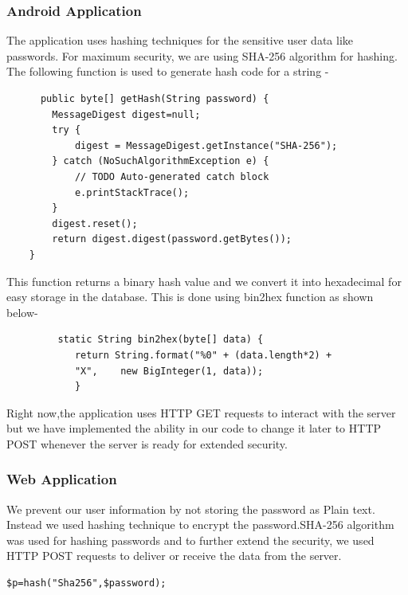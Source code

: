 \documentclass{article}
\begin{document}
\subsubsection{Android Application}
The application uses hashing techniques for the sensitive user data like passwords. 
For maximum security, we are using SHA-256 algorithm for hashing. 
The following function is used to generate hash code for a string -
\begin{lstlisting}
      public byte[] getHash(String password) {
        MessageDigest digest=null;
        try {
            digest = MessageDigest.getInstance("SHA-256");
        } catch (NoSuchAlgorithmException e) {
            // TODO Auto-generated catch block
            e.printStackTrace();
        }
        digest.reset();
        return digest.digest(password.getBytes());
    }
\end{lstlisting}
This function returns a binary hash value and we convert it into hexadecimal for easy storage in the database. This is done using bin2hex function as shown below-
\begin{lstlisting}
         static String bin2hex(byte[] data) {
        	return String.format("%0" + (data.length*2) + 
        	"X", 	new BigInteger(1, data));
    		}
\end{lstlisting}
Right now,the application uses HTTP GET requests to interact with the server but we have implemented the ability in our code to change it later to HTTP POST whenever the server is ready for extended security. 

\subsubsection{Web Application}
We prevent our user information by not storing the password as Plain text. Instead we used hashing technique to encrypt the password.SHA-256 algorithm was used for hashing passwords and to further extend the security, we used HTTP POST requests to deliver or receive the data from the server.
\begin{lstlisting}
$p=hash("Sha256",$password);
\end{lstlisting}
\end{document}

